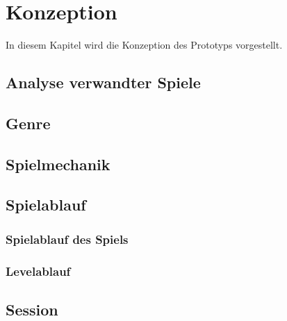 \chapter{Konzeption}
In diesem Kapitel wird die Konzeption des Prototyps vorgestellt.



\section{Analyse verwandter Spiele}

\section{Genre}

\section{Spielmechanik}

\section{Spielablauf}

\subsection{Spielablauf des Spiels}

\subsection{Levelablauf}

\section{Session}


